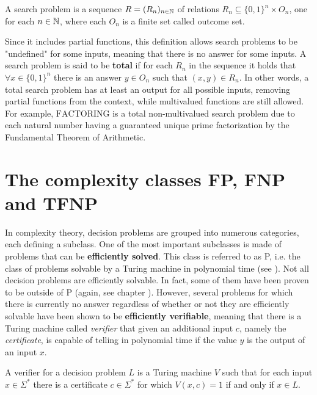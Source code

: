 \begin{definition}
 A search problem is a sequence $R = (R_n)_{n \in \mathbb{N}}$ of relations $R_n \subseteq \{0,1\}^n \times O_n$, one for each $n \in \mathbb{N}$, where each $O_n$ is a finite set called outcome set.
\end{definition}

Since it includes partial functions, this definition allows search problems to be "undefined" for some inputs, meaning that there is no answer for some inputs. A search problem is said to be \textbf{total} if for each $R_n$ in the sequence it holds that $\forall x \in \{0,1\}^n$ there is an answer $y \in O_n$ such that $(x,y) \in R_n$. In other words, a total search problem has at least an output for all possible inputs, removing partial functions from the context, while multivalued functions are still allowed. For example, $\mathrm{FACTORING}$ is a total non-multivalued search problem due to each natural number having a guaranteed unique prime factorization by the Fundamental Theorem of Arithmetic.

\newpage

\section{The complexity classes \textsf{FP}, \textsf{FNP} and \textsf{TFNP}}

In complexity theory, decision problems are grouped into numerous categories, each defining a subclass. One of the most important subclasses is made of problems that can be \textbf{efficiently solved}. This class is referred to as \textsf{P}, i.e. the class of problems solvable by a Turing machine in polynomial time (see ). Not all decision problems are efficiently solvable. In fact, some of them have been proven to be outside of \textsf{P} (again, see chapter ). However, several problems for which there is currently no answer regardless of whether or not they are efficiently solvable have been shown to be \textbf{efficiently verifiable}, meaning that there is a Turing machine called \textit{verifier} that given an additional input $c$, namely the \textit{certificate}, is capable of telling in polynomial time if the value $y$ is the output of an input $x$.

\begin{definition}
 A verifier for a decision problem $L$ is a Turing machine $V$ such that for each input $x \in \Sigma^*$ there is a certificate $c \in \Sigma^*$ for which $V(x,c) = 1$ if and only if $x \in L$.
\end{definition}

